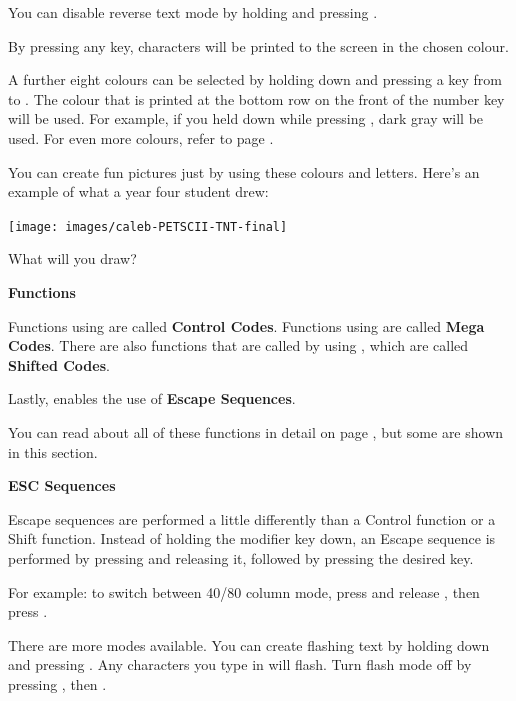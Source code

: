 You can disable reverse text mode by holding  and pressing .

By pressing any key, characters will be printed to the screen in the chosen colour.

A further eight colours can be selected by holding down \megasymbolkey and pressing a key from  to .
The colour that is printed at the bottom row on the front of the number key will be used. For example, if you held
\megasymbolkey down while pressing , dark gray will be used. For even more colours, refer to page \pageref{appendix:escape-colours}.

\needspace{4cm}
You can create fun pictures just by using these colours and letters.  Here's an example of what a year four student drew:

\begin{center}
\texttt{[image: images/caleb-PETSCII-TNT-final]}
\end{center}

What will you draw?

\needspace{2cm}
\textbf{Functions}

Functions using  are called \textbf{Control Codes}.
Functions using \megasymbolkey are called \textbf{Mega Codes}. There are also functions that are called by using , which
are called \textbf{Shifted Codes}.

Lastly,  enables the use of \textbf{Escape Sequences}.

You can read about all of these functions in detail on page \pageref{appendix:controlcodes}, but some are shown in this section.

\needspace{2cm}
\textbf{ESC Sequences}

Escape sequences are performed a little differently than a Control function or a Shift function. Instead of holding the modifier key down, an Escape sequence is performed by pressing  and releasing it, followed by pressing the desired key.

For example: to switch between 40/80 column mode, press and release , then press .

There are more modes available. You can create flashing text by holding  down and pressing . Any characters you type in will flash. Turn flash mode off by pressing ,  then .



